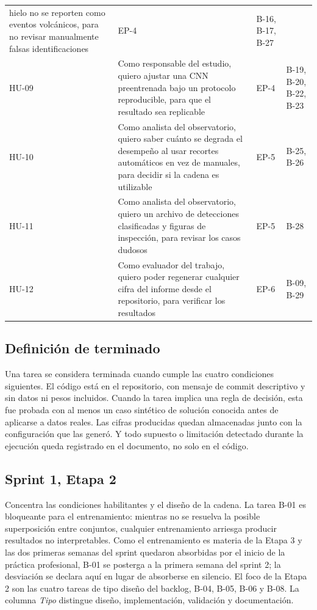 {\begin{longtable}{>{\raggedright\arraybackslash}p{1.2cm}>{\raggedright\arraybackslash}p{7.6cm}>{\raggedright\arraybackslash}p{1.0cm}>{\raggedright\arraybackslash}p{1.9cm}}
hielo no se reporten como eventos volcánicos, para no revisar manualmente falsas
identificaciones & EP-4 & B-16, B-17, B-27 \\
\addlinespace
HU-09 & Como responsable del estudio, quiero ajustar una CNN preentrenada bajo
un protocolo reproducible, para que el resultado sea replicable & EP-4 & B-19,
B-20, B-22, B-23 \\
\addlinespace
HU-10 & Como analista del observatorio, quiero saber cuánto se degrada el
desempeño al usar recortes automáticos en vez de manuales, para decidir si la
cadena es utilizable & EP-5 & B-25, B-26 \\
\addlinespace
HU-11 & Como analista del observatorio, quiero un archivo de detecciones
clasificadas y figuras de inspección, para revisar los casos dudosos & EP-5 &
B-28 \\
\addlinespace
HU-12 & Como evaluador del trabajo, quiero poder regenerar cualquier cifra del
informe desde el repositorio, para verificar los resultados & EP-6 & B-09,
B-29 \\
\bottomrule
\end{longtable}
}

\subsection{Definición de terminado}
\label{sec:anexo-dod}

Una tarea se considera terminada cuando cumple las cuatro condiciones siguientes.
El código está en el repositorio, con mensaje de commit descriptivo y sin datos ni
pesos incluidos. Cuando la tarea implica una regla de decisión, esta fue probada
con al menos un caso sintético de solución conocida antes de aplicarse a datos
reales. Las cifras producidas quedan almacenadas junto con la configuración que
las generó. Y todo supuesto o limitación detectado durante la ejecución queda
registrado en el documento, no solo en el código.

\subsection{Sprint 1, Etapa 2}
\label{sec:anexo-s1}

Concentra las condiciones habilitantes y el diseño de la cadena. La tarea B-01
es bloqueante para el entrenamiento: mientras no se resuelva la posible
superposición entre conjuntos, cualquier entrenamiento arriesga producir
resultados no interpretables. Como el entrenamiento es materia de la Etapa 3 y
las dos primeras semanas del sprint quedaron absorbidas por el inicio de la
práctica profesional, B-01 se posterga a la primera semana del sprint 2; la
desviación se declara aquí en lugar de absorberse en silencio. El foco de la
Etapa 2 son las cuatro tareas de tipo diseño del backlog, B-04, B-05, B-06 y
B-08. La columna
\emph{Tipo} distingue diseño, implementación, validación y documentación.

